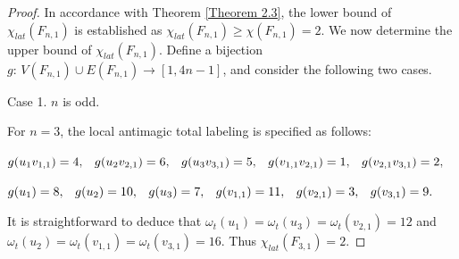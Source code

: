 \documentclass[12pt]{article}
\begin{document}
\begin{proof}
In accordance with Theorem \ref{Theorem 2.3}, the lower bound of $\chi_{lat}(F_{n,1})$ is established as $\chi_{lat}(F_{n,1})\geq \chi(F_{n,1})=2$. We now determine the upper bound of $\chi_{lat}(F_{n,1})$. Define a bijection  $g:\,V(F_{n,1})\cup E(F_{n,1}) \rightarrow[1, 4n-1]$, and consider the following two cases.

Case 1. $n$ is odd.

For $n=3$, the local antimagic total labeling is specified as follows:

$ g(u_{1}v_{1,1})=4, \hspace{0.8em}g(u_{2}v_{2,1})=6, \hspace{0.8em} g(u_{3}v_{3,1})=5, \hspace{0.8em} g(v_{1,1}v_{2,1})=1, \hspace{0.8em} g(v_{2,1}v_{3,1})=2,$

$g(u_{1})=8, \hspace{0.8em}g(u_{2})=10, \hspace{0.8em}g(u_{3})=7, \hspace{0.8em} g(v_{1,1})=11, \hspace{0.8em} g(v_{2,1})=3,\hspace{0.8em} g(v_{3,1})=9.$

It is straightforward to deduce that $\omega_{t}(u_1)=\omega_{t}(u_3)=\omega_{t}(v_{2,1})=12$ and $\omega_{t}(u_2)=\omega_{t}(v_{1,1})=\omega_{t}(v_{3,1})=16$. Thus $\chi_{lat}(F_{3,1})=2$.


\end{proof}
\end{document}
